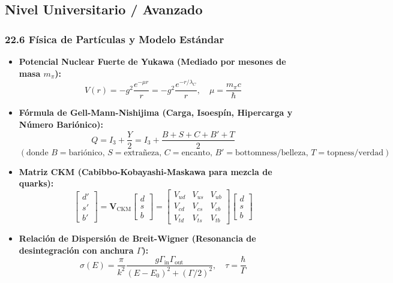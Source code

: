 \documentclass[11pt,a4paper]{article}
\begin{document}
\subsection*{Nivel Universitario / Avanzado}

\subsubsection*{22.6 Física de Partículas y Modelo Estándar}

\begin{itemize}
  \item \textbf{Potencial Nuclear Fuerte de Yukawa (Mediado por mesones de masa $m_\pi$):}
  \[
    V(r) = -g^2 \frac{e^{-\mu r}}{r} = -g^2 \frac{e^{-r / \lambda_C}}{r}, \quad \mu = \frac{m_\pi c}{\hbar}
  \]
  \item \textbf{Fórmula de Gell-Mann-Nishijima (Carga, Isoespín, Hipercarga y Número Bariónico):}
  \[
    Q = I_3 + \frac{Y}{2} = I_3 + \frac{B + S + C + B' + T}{2}
  \]
  \[
    (\text{donde } B = \text{bariónico}, \, S = \text{extrañeza}, \, C = \text{encanto}, \, B' = \text{bottomness/belleza}, \, T = \text{topness/verdad})
  \]
  \item \textbf{Matriz CKM (Cabibbo-Kobayashi-Maskawa para mezcla de quarks):}
  \[
    \begin{bmatrix} d' \\ s' \\ b' \end{bmatrix} = \mathbf{V}_{\text{CKM}} \begin{bmatrix} d \\ s \\ b \end{bmatrix} = \begin{bmatrix} V_{ud} & V_{us} & V_{ub} \\ V_{cd} & V_{cs} & V_{cb} \\ V_{td} & V_{ts} & V_{tb} \end{bmatrix} \begin{bmatrix} d \\ s \\ b \end{bmatrix}
  \]
  \item \textbf{Relación de Dispersión de Breit-Wigner (Resonancia de desintegración con anchura $\Gamma$):}
  \[
    \sigma(E) = \frac{\pi}{k^2} \frac{g \Gamma_{\text{in}} \Gamma_{\text{out}}}{(E - E_0)^2 + (\Gamma/2)^2}, \quad \tau = \frac{\hbar}{\Gamma}
  \]
\end{itemize}
\end{document}
